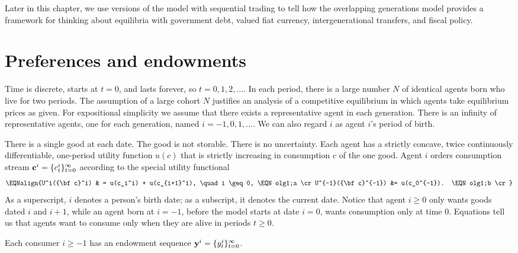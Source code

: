 

Later in this chapter,
  we use versions of the model with
sequential trading  to tell how the overlapping
generations model provides  a framework for thinking about equilibria
with government debt, valued fiat currency, intergenerational
transfers, and fiscal policy.



\section{Preferences and endowments}

Time is discrete, starts at $t=0$,
and  lasts forever, so $t=0, 1, 2, \ldots$. In each period, 
there is a large number $N$ of identical agents born who 
live for two periods. The assumption of a large cohort
$N$ justifies an  analysis of a competitive equilibrium
in which agents take equilibrium prices as given. 
For expositional simplicity
we assume that there exists  a representative agent in each generation.
There is an infinity of representative agents,
one for each generation,
named $i=-1, 0, 1, \ldots$.  We can also regard $i$ as 
agent $i$'s period of birth.

  There is a single good at each date. The good is not storable.  There is no uncertainty.
  Each agent has a
strictly concave, twice  continuously
differentiable, one-period utility function $u(c)$ that
is strictly increasing in consumption  $c$ of the one good.
  Agent $i$ orders consumption stream  
${\bf c}^i = \{c_t^i\}_{t=0}^\infty$ according to the
  special  utility functional
$$\EQNalign{U^i({\bf c}^i) & = u(c_i^i) + u(c_{i+1}^i), \quad i \geq 0,
 \EQN olg1;a \cr
    U^{-1}({\bf c}^{-1}) &= u(c_0^{-1}). \EQN olg1;b \cr} $$
As a superscript, $i$ denotes a person's birth date; as a subscript, it denotes the current date.  
Notice that agent $i \geq 0 $ only wants goods dated $i$ and $i+1$, while an agent born at $i=-1$, before the
model starts at date $i =0$, wants consumption only at time $0$.
Equations  tell us  that agents
want to consume only when they are alive in periods $t\geq 0$.

Each consumer $i \geq -1$ has an endowment sequence 
${\bf y}^i = \{y_t^i\}_{t=0}^\infty$.

